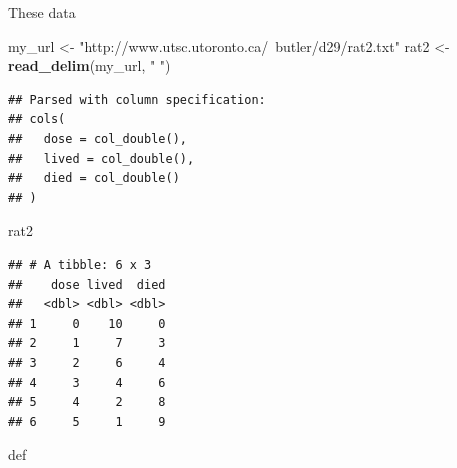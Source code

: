 \documentclass[ignorenonframetext,]{beamer}
\newenvironment{Shaded}{\begin{snugshade}}{\end{snugshade}}
\newcommand{\KeywordTok}[1]{\textcolor[rgb]{0.13,0.29,0.53}{\textbf{#1}}}
\newcommand{\NormalTok}[1]{#1}
\newcommand{\StringTok}[1]{\textcolor[rgb]{0.31,0.60,0.02}{#1}}
\begin{document}
\begin{frame}[fragile]{These data}
\protect\hypertarget{these-data}{}

\begin{Shaded}
\begin{Highlighting}[]
\NormalTok{my_url <-}\StringTok{ "http://www.utsc.utoronto.ca/~butler/d29/rat2.txt"}
\NormalTok{rat2 <-}\StringTok{ }\KeywordTok{read_delim}\NormalTok{(my_url, }\StringTok{" "}\NormalTok{)}
\end{Highlighting}
\end{Shaded}

\begin{verbatim}
## Parsed with column specification:
## cols(
##   dose = col_double(),
##   lived = col_double(),
##   died = col_double()
## )
\end{verbatim}

\begin{Shaded}
\begin{Highlighting}[]
\NormalTok{rat2}
\end{Highlighting}
\end{Shaded}

\begin{verbatim}
## # A tibble: 6 x 3
##    dose lived  died
##   <dbl> <dbl> <dbl>
## 1     0    10     0
## 2     1     7     3
## 3     2     6     4
## 4     3     4     6
## 5     4     2     8
## 6     5     1     9
\end{verbatim}

def

\end{frame}
\end{document}
